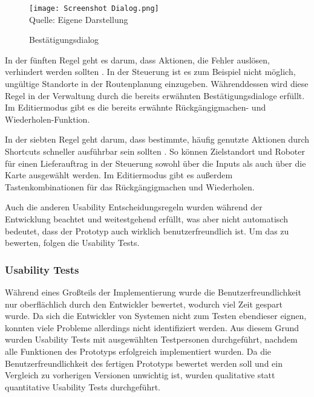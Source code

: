 \begin{figure}[H]
    \caption{Bestätigungsdialog}\label{fig:DialogScreenshot}
    \texttt{[image: Screenshot Dialog.png]}
    \\
    Quelle: Eigene Darstellung
\end{figure}

In der fünften Regel geht es darum, dass Aktionen, die Fehler auslösen, verhindert werden sollten \cite[Regel 5]{Nielsen.1994}. In der Steuerung ist es zum Beispiel nicht möglich, ungültige Standorte in der Routenplanung einzugeben. Währenddessen wird diese Regel in der Verwaltung durch die bereits erwähnten Bestätigungsdialoge erfüllt. Im Editiermodus gibt es die bereits erwähnte Rückgängigmachen- und Wiederholen-Funktion.

In der siebten Regel geht darum, dass bestimmte, häufig genutzte Aktionen durch Shortcuts schneller ausführbar sein sollten \cite[Regel 7]{Nielsen.1994}. So können Zielstandort und Roboter für einen Lieferauftrag in der Steuerung sowohl über die Inputs als auch über die Karte ausgewählt werden. Im Editiermodus gibt es außerdem Tastenkombinationen für das Rückgängigmachen und Wiederholen.

Auch die anderen Usability Entscheidungsregeln wurden während der Entwicklung beachtet und weitestgehend erfüllt, was aber nicht automatisch bedeutet, dass der Prototyp auch wirklich benutzerfreundlich ist. Um das zu bewerten, folgen die Usability Tests.

\subsubsection{Usability Tests}\label{sec:UsabilityTests}
Während eines Großteils der Implementierung wurde die Benutzerfreundlichkeit nur oberflächlich durch den Entwickler bewertet, wodurch viel Zeit gespart wurde. Da sich die Entwickler von Systemen nicht zum Testen ebendieser eignen, konnten viele Probleme allerdings nicht identifiziert werden. Aus diesem Grund wurden Usability Tests mit ausgewählten Testpersonen durchgeführt, nachdem alle Funktionen des Prototyps erfolgreich implementiert wurden. Da die Benutzerfreundlichkeit des fertigen Prototyps bewertet werden soll und ein Vergleich zu vorherigen Versionen unwichtig ist, wurden qualitative statt quantitative Usability Tests durchgeführt.


